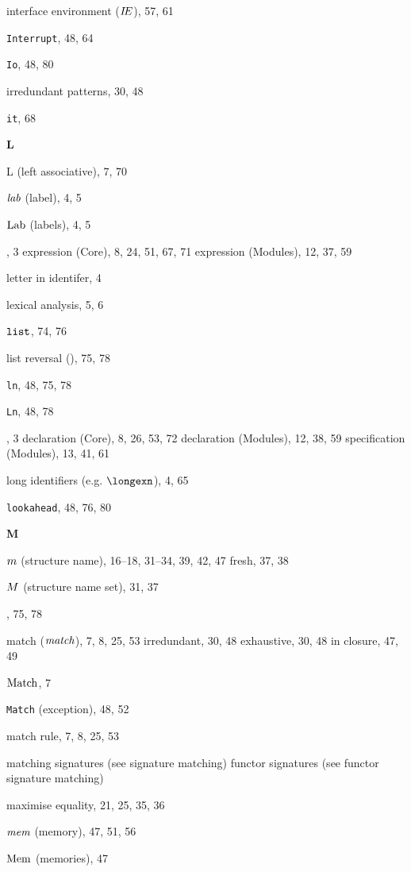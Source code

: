 \begin{theindex}
\item interface environment ($\mbox{$I\!E$}$), 57, 61
\item {\tt Interrupt}, 48, 64
\item {\tt Io}, 48, 80
\item irredundant patterns, 30, 48
\item {\tt it}, 68
\indexspace
\parbox{65mm}{\hfil{\large\bf L}\hfil}
\indexspace
\item L (left associative), 7, 70
\item ${\it lab}$ (label), 4, 5
\item ${\rm Lab}$ (labels), 4, 5
\item \LET, 3
\subitem expression (Core), 8, 24, 51, 67, 71
\subitem expression (Modules), 12, 37, 59
\item letter in identifer, 4
\item lexical analysis, 5, 6
\item $\mbox{\tt list}$, 74, 76
\item list reversal (), 75, 78
\item {\tt ln}, 48, 75, 78
\item {\tt Ln}, 48, 78
\item \LOCAL, 3
\subitem declaration (Core), 8, 26, 53, 72
\subitem declaration (Modules), 12, 38, 59
\subitem specification (Modules), 13, 41, 61
\item long identifiers (e.g. $\longexn$), 4, 65
\item {\tt lookahead}, 48, 76, 80
\indexspace
\parbox{65mm}{\hfil{\large\bf M}\hfil}
\indexspace
\item $m$ (structure name), 16--18, 31--34, 39, 42, 47
\subitem fresh, 37, 38
\item $M$ (structure name set), 31, 37
\item {}, 75, 78
\item match (${\it match}$), 7, 8, 25, 53
\subitem irredundant, 30, 48
\subitem exhaustive, 30, 48
\subitem in closure, 47, 49
\item ${\rm Match}$, 7
\item {\tt Match} (exception), 48, 52
\item match rule, 7, 8, 25, 53
\item matching 
\subitem signatures (see signature matching) 
\subitem functor signatures (see functor signature matching) 
\item maximise equality, 21, 25, 35, 36
\item $\mbox{\it mem}$ (memory), 47, 51, 56
\item ${\rm Mem}$ (memories), 47

\end{theindex}
